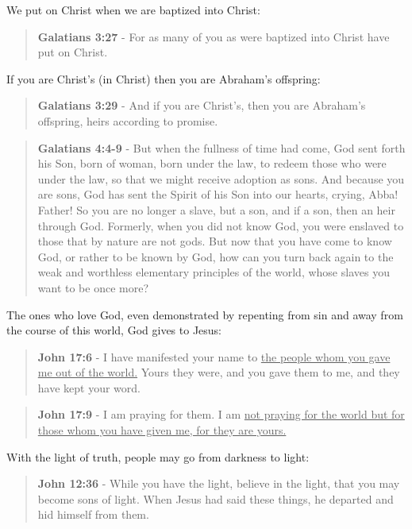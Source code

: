 \documentclass[11pt]{article}
\begin{document}
We put on Christ when we are baptized into Christ:

\begin{quote}
\textbf{Galatians 3:27} - For as many of you as were baptized into Christ have put on Christ.
\end{quote}

If you are Christ's (in Christ) then you are Abraham's offspring:

\begin{quote}
\textbf{Galatians 3:29} - And if you are Christ's, then you are Abraham's offspring, heirs according to promise.
\end{quote}

\begin{quote}
\textbf{Galatians 4:4-9} - But when the fullness of time had come, God sent forth his Son, born of woman, born under the law, to redeem those who were under the law, so that we might receive adoption as sons.  And because you are sons, God has sent the Spirit of his Son into our hearts, crying, Abba! Father!  So you are no longer a slave, but a son, and if a son, then an heir through God.  Formerly, when you did not know God, you were enslaved to those that by nature are not gods.  But now that you have come to know God, or rather to be known by God, how can you turn back again to the weak and worthless elementary principles of the world, whose slaves you want to be once more?
\end{quote}

The ones who love God, even demonstrated by repenting from sin and away from the course of this world, God gives to Jesus:

\begin{quote}
\textbf{John 17:6} - I have manifested your name to \uline{the people whom you gave me out of the world.} Yours they were, and you gave them to me, and they have kept your word.
\end{quote}

\begin{quote}
\textbf{John 17:9} - I am praying for them. I am \uline{not praying for the world but for those whom you have given me, for they are yours.}
\end{quote}

With the light of truth, people may go from darkness to light:

\begin{quote}
\textbf{John 12:36} - While you have the light, believe in the light, that you may become sons of light. When Jesus had said these things, he departed and hid himself from them.
\end{quote}
\end{document}
